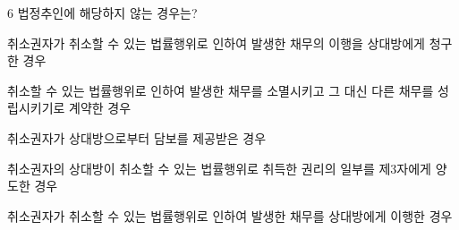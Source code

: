 \begin{question}{6}
법정추인에 해당하지 않는 경우는?
\begin{choices}
  \item 취소권자가 취소할 수 있는 법률행위로 인하여 발생한 채무의 이행을 상대방에게 청구한 경우
  \item 취소할 수 있는 법률행위로 인하여 발생한 채무를 소멸시키고 그 대신 다른 채무를 성립시키기로 계약한 경우
  \item 취소권자가 상대방으로부터 담보를 제공받은 경우
  \item 취소권자의 상대방이 취소할 수 있는 법률행위로 취득한 권리의 일부를 제3자에게 양도한 경우
  \item 취소권자가 취소할 수 있는 법률행위로 인하여 발생한 채무를 상대방에게 이행한 경우
\end{choices}
\end{question}
